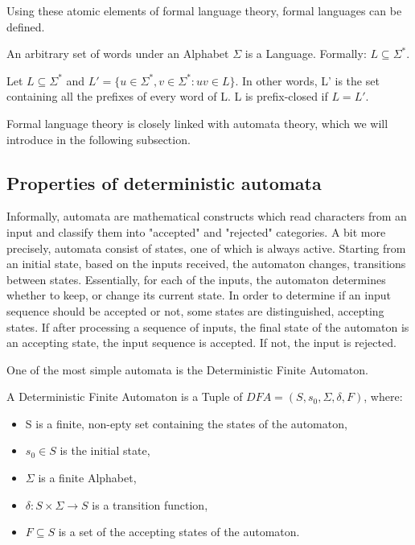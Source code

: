 Using these atomic elements of formal language theory, formal languages can be defined.

\begin{definition}
	An arbitrary set of words under an Alphabet $\Sigma$ is a Language. Formally: $L\subseteq\Sigma^{*}$.
\end{definition}

\begin{definition}
	Let $L\subseteq\Sigma^*$ and $L' = \{u\in\Sigma^*, v\in\Sigma^* : uv\in L\}$. In other words, L' is the set containing all the prefixes of every word of L. L is prefix-closed if $L = L'$.
\end{definition}

Formal language theory is closely linked with automata theory, which we will introduce in the following subsection.

\subsection{Properties of deterministic automata}

Informally, automata are mathematical constructs which read characters from an input and classify them into "accepted" and "rejected" categories. A bit more precisely, automata consist of states, one of which is always active. Starting from an initial state, based on the inputs received, the automaton changes, transitions between states. Essentially, for each of the inputs, the automaton determines whether to keep, or change its current state. In order to determine if an input sequence should be accepted or not, some states are distinguished, accepting states. If after processing a sequence of inputs, the final state of the automaton is an accepting state, the input sequence is accepted. If not, the input is rejected.


One of the most simple automata is the Deterministic Finite Automaton.

\begin{definition}
	A Deterministic Finite Automaton is a Tuple of $ DFA=(S,s_{0},\Sigma,\delta,F) $, where: 
	\begin{itemize}
		\item S is a finite, non-epty set containing the states of the automaton,
		\item $s_{0} \in S$ is the initial state,
		\item $\Sigma$ is a finite Alphabet,
		\item $\delta: S\times \Sigma \to S$ is a transition function,
		\item $F\subseteq S$ is a set of the accepting states of the automaton. 
	\end{itemize}
\end{definition}

